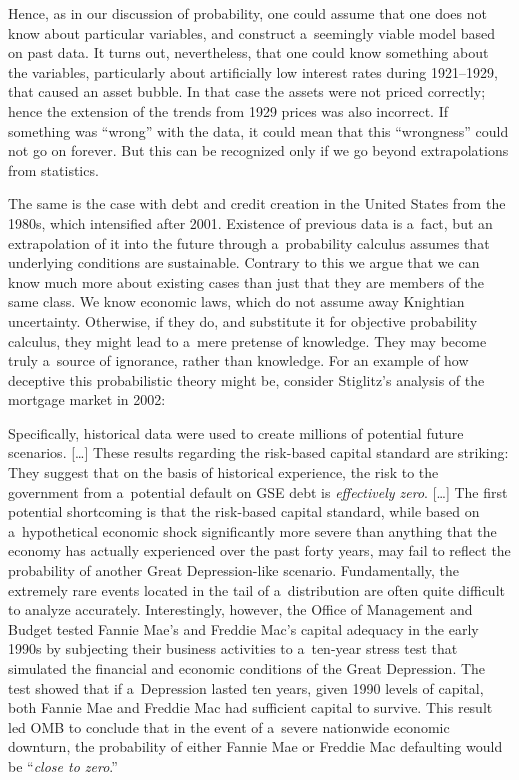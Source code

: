 Hence, as in our discussion of probability, one could assume that one does not know about particular variables, and construct a~seemingly viable model based on past data. It turns out, nevertheless, that one could know something about the variables, particularly about artificially low interest rates during 1921–1929, that caused an asset bubble. In that case the assets were not priced correctly; hence the extension of the trends from 1929 prices was also incorrect. If something was ``wrong'' with the data, it could mean that this ``wrongness'' could not go on forever. But this can be recognized only if we go beyond extrapolations from statistics.



The same is the case with debt and credit creation in the United States from the 1980s, which intensified after 2001. Existence of previous data is a~fact, but an extrapolation of it into the future through a~probability calculus assumes that underlying conditions are sustainable. Contrary to this we argue that we can know much more about existing cases than just that they are members of the same class. We know economic laws, which do not assume away Knightian uncertainty. Otherwise, if they do, and substitute it for objective probability calculus, they might lead to a~mere pretense of knowledge. They may become truly a~source of ignorance, rather than knowledge. For an example of how deceptive this probabilistic theory might be, consider Stiglitz's analysis of the mortgage market in 2002:



Specifically, historical data were used to create millions of potential future scenarios. […] These results regarding the risk-based capital standard are striking: They suggest that on the basis of historical experience, the risk to the government from a~potential default on GSE debt is \textit{effectively zero}. […] The first potential shortcoming is that the risk-based capital standard, while based on a~hypothetical economic shock significantly more severe than anything that the economy has actually experienced over the past forty years, may fail to reflect the probability of another Great Depression-like scenario. Fundamentally, the extremely rare events located in the tail of a~distribution are often quite difficult to analyze accurately. Interestingly, however, the Office of Management and Budget tested Fannie Mae's and Freddie Mac's capital adequacy in the early 1990s by subjecting their business activities to a~ten-year stress test that simulated the financial and economic conditions of the Great Depression. The test showed that if a~Depression lasted ten years, given 1990 levels of capital, both Fannie Mae and Freddie Mac had sufficient capital to survive. This result led OMB to conclude that in the event of a~severe nationwide economic downturn, the probability of either Fannie Mae or Freddie Mac defaulting would be ``\textit{close to zero}.'' 
\parencite[][emphasis added]{stiglitz_implications_2002}%




